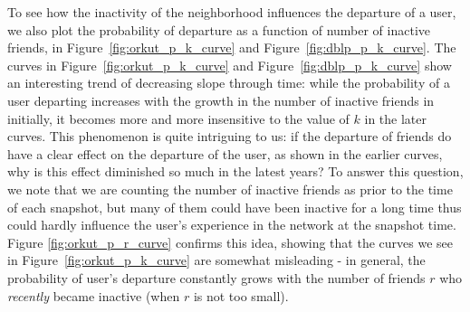 \documentclass[phd,tocprelim]{cornell}
\begin{document}
To see how the inactivity of the neighborhood influences the departure of a user, we also plot the probability of departure as a function of number of inactive friends, in Figure~\ref{fig:orkut_p_k_curve} and Figure~\ref{fig:dblp_p_k_curve}. The curves in Figure~\ref{fig:orkut_p_k_curve} and Figure~\ref{fig:dblp_p_k_curve} show an interesting trend of decreasing slope through time: while the probability of a user departing increases with the growth in the number of inactive friends in initially, it becomes more and more insensitive to the value of $k$ in the later curves. This phenomenon is quite intriguing to us: if the departure of friends do have a clear effect on the departure of the user, as shown in the earlier curves, why is this effect diminished so much in the latest years? To answer this question, we note that we are counting the number of inactive friends as prior to the time of each snapshot, but many of them could have been inactive for a long time thus could hardly influence the user's experience in the network at the snapshot time. Figure \ref{fig:orkut_p_r_curve} confirms this idea, showing that the curves we see in Figure~\ref{fig:orkut_p_k_curve} are somewhat misleading -  in general, the probability of user's departure constantly grows with the number of friends $r$ who \emph{recently} became inactive (when $r$ is not too small). 
 


\end{document}
